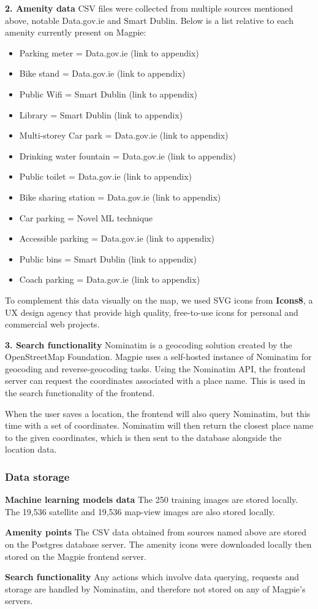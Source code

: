 \textbf{2. Amenity data}
CSV files were collected from multiple sources mentioned above, notable
Data.gov.ie and Smart Dublin. Below is a list relative to each amenity currently
present on Magpie:
\begin{itemize}
    \item Parking meter = Data.gov.ie (link to appendix)
    \item Bike stand = Data.gov.ie (link to appendix)
    \item Public Wifi = Smart Dublin (link to appendix)
    \item Library = Smart Dublin (link to appendix)
    \item Multi-storey Car park = Data.gov.ie (link to appendix)
    \item Drinking water fountain = Data.gov.ie (link to appendix)
    \item Public toilet = Data.gov.ie (link to appendix)
    \item Bike sharing station = Data.gov.ie (link to appendix)
    \item Car parking = Novel ML technique
    \item Accessible parking = Data.gov.ie (link to appendix)
    \item Public bins = Smart Dublin (link to appendix)
    \item Coach parking = Data.gov.ie (link to appendix)
\end{itemize}
To complement this data visually on the map, we used SVG icons from
\textbf{Icons8}, a UX design agency that provide high quality, free-to-use icons
for personal and commercial web projects.

\textbf{3. Search functionality}
Nominatim is a geocoding solution created by the OpenStreetMap Foundation.
Magpie uses a self-hosted instance of Nominatim for geocoding and
reverse-geocoding tasks. Using the Nominatim API, the frontend server can
request the coordinates associated with a place name. This is used in the search
functionality of the frontend.

When the user saves a location, the frontend will also query Nominatim, but this
time with a set of coordinates. Nominatim will then return the closest place
name to the given coordinates, which is then sent to the database alongside the
location data.

\subsubsection{Data storage}
\textbf{Machine learning models data}
The 250 training images are stored locally.
The 19,536 satellite and 19,536 map-view images are also stored locally.

\textbf{Amenity points}
The CSV data obtained from sources named above are stored on the Postgres database server.
The amenity icons were downloaded locally then stored on the Magpie frontend server.

\textbf{Search functionality}
Any actions which involve data querying, requests and storage are handled by
Nominatim, and therefore not stored on any of Magpie's servers.

\newpage{}